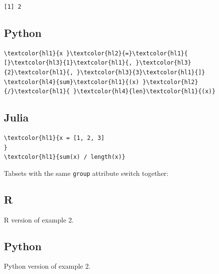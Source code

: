 \documentclass[11pt]{article}
\begin{document}
\begin{outcode}
\begin{verbatim}
[1] 2
\end{verbatim}
\end{outcode}

\subsection*{Python}
\label{python}



\begin{srccode}
\begin{Verbatim}[commandchars=\\\{\}]
\textcolor{hl1}{x }\textcolor{hl2}{=}\textcolor{hl1}{ [}\textcolor{hl3}{1}\textcolor{hl1}{, }\textcolor{hl3}{2}\textcolor{hl1}{, }\textcolor{hl3}{3}\textcolor{hl1}{]}
\textcolor{hl4}{sum}\textcolor{hl1}{(x) }\textcolor{hl2}{/}\textcolor{hl1}{ }\textcolor{hl4}{len}\textcolor{hl1}{(x)}
\end{Verbatim}
\end{srccode}

\subsection*{Julia}
\label{julia}



\begin{srccode}
\begin{Verbatim}[commandchars=\\\{\}]
\textcolor{hl1}{x = [1, 2, 3]
}
\textcolor{hl1}{sum(x) / length(x)}
\end{Verbatim}
\end{srccode}

Tabsets with the same \texttt{group} attribute switch together:



\subsection*{R}
\label{r}

R version of example 2.

\subsection*{Python}
\label{python}

Python version of example 2.
\end{document}
